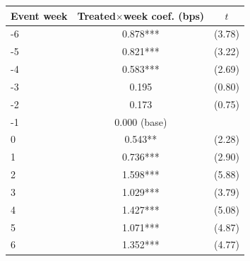 \begin{tabular}{lcc}
\toprule
Event week & Treated$\times$week coef. (bps) & $t$ \\
\midrule
-6 & 0.878*** & (3.78) \\
-5 & 0.821*** & (3.22) \\
-4 & 0.583*** & (2.69) \\
-3 & 0.195 & (0.80) \\
-2 & 0.173 & (0.75) \\
-1 & 0.000 (base) &  \\
0 & 0.543** & (2.28) \\
1 & 0.736*** & (2.90) \\
2 & 1.598*** & (5.88) \\
3 & 1.029*** & (3.79) \\
4 & 1.427*** & (5.08) \\
5 & 1.071*** & (4.87) \\
6 & 1.352*** & (4.77) \\
\bottomrule
\end{tabular}